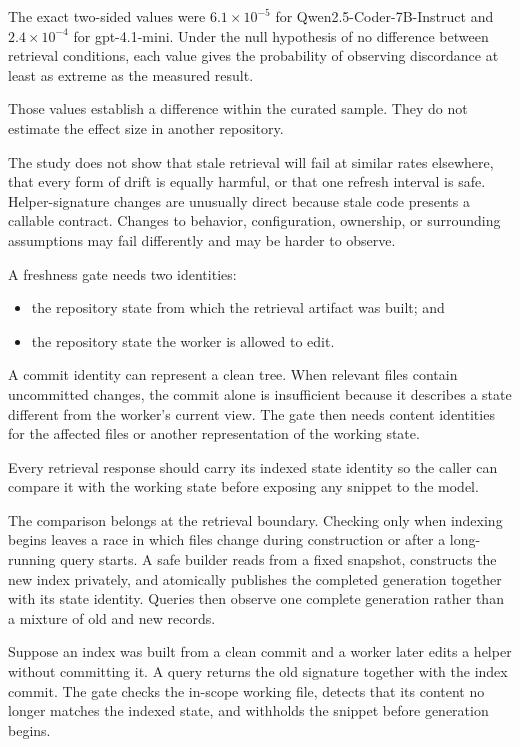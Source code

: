 The exact two-sided values were \(6.1 \times 10^{-5}\) for Qwen2.5-Coder-7B-Instruct and \(2.4 \times 10^{-4}\) for gpt-4.1-mini. Under the null hypothesis of no difference between retrieval conditions, each value gives the probability of observing discordance at least as extreme as the measured result.

Those values establish a difference within the curated sample. They do not estimate the effect size in another repository.

The study does not show that stale retrieval will fail at similar rates elsewhere, that every form of drift is equally harmful, or that one refresh interval is safe. Helper-signature changes are unusually direct because stale code presents a callable contract. Changes to behavior, configuration, ownership, or surrounding assumptions may fail differently and may be harder to observe.


A freshness gate needs two identities:

\begin{itemize}
\tightlist
\item
  the repository state from which the retrieval artifact was built; and
\item
  the repository state the worker is allowed to edit.
\end{itemize}

A commit identity can represent a clean tree. When relevant files contain uncommitted changes, the commit alone is insufficient because it describes a state different from the worker's current view. The gate then needs content identities for the affected files or another representation of the working state.

Every retrieval response should carry its indexed state identity so the caller can compare it with the working state before exposing any snippet to the model.

The comparison belongs at the retrieval boundary. Checking only when indexing begins leaves a race in which files change during construction or after a long-running query starts. A safe builder reads from a fixed snapshot, constructs the new index privately, and atomically publishes the completed generation together with its state identity. Queries then observe one complete generation rather than a mixture of old and new records.

Suppose an index was built from a clean commit and a worker later edits a helper without committing it. A query returns the old signature together with the index commit. The gate checks the in-scope working file, detects that its content no longer matches the indexed state, and withholds the snippet before generation begins.

